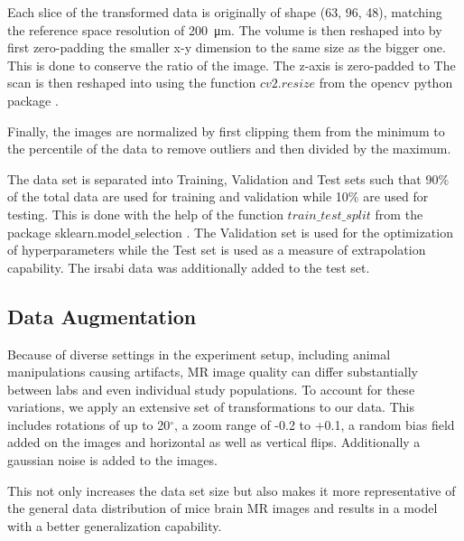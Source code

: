 Each slice of the transformed data is originally of shape (63, 96, 48), matching the reference space resolution of \SI{200}{\micro\metre}.
The volume is then reshaped into
by first zero-padding the smaller x-y dimension to the same size as the bigger one.
This is done to conserve the ratio of the image.
The z-axis is zero-padded to
The scan is then reshaped into
using the function \textcolor{mg}{\texttt{$cv2.resize$}} from the opencv python package \cite{noauthor_opencv-python_nodate}.

Finally, the images are normalized by first clipping them from the minimum to the  percentile of the data to remove outliers and then divided by the maximum.

The data set is separated into Training, Validation and Test sets such that 90\% of the total data are used for training and validation while 10\% are used for testing.
This is done with the help of the function \textcolor{mg}{\texttt{$train\_test\_split$}} from the package sklearn.model$\_$selection \cite{scikit-learn}.
The Validation set is used for the optimization of hyperparameters while the Test set is used as a measure of extrapolation capability.
The irsabi data was additionally added to the test set.

\subsection{Data Augmentation} \label{Data Augmentation}

Because of diverse settings in the experiment setup, including animal manipulations causing artifacts, MR image quality can differ substantially between labs and even individual study populations.
To account for these variations, we apply an extensive set of transformations to our data.
This includes rotations of up to 20$^{\circ}$, a zoom range of -0.2 to +0.1, a random bias field added on the images and horizontal as well as vertical flips.
Additionally a gaussian noise is added to the images.

This not only increases the data set size but also makes it more representative of the general data distribution of mice brain MR images and results in a model with a better generalization capability.

